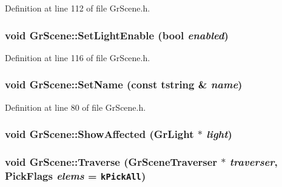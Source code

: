 Definition at line 112 of file GrScene.h.\hypertarget{class_gr_scene_1834cc42ace852985a396a950847a57e}{
\subsubsection[{SetLightEnable}]{\setlength{\rightskip}{0pt plus 5cm}void GrScene::SetLightEnable (bool {\em enabled})}}
\label{class_gr_scene_1834cc42ace852985a396a950847a57e}




Definition at line 116 of file GrScene.h.\hypertarget{class_gr_scene_73ef4498b63c8574ad8c34c81b8c5baf}{
\subsubsection[{SetName}]{\setlength{\rightskip}{0pt plus 5cm}void GrScene::SetName (const {\bf tstring} \& {\em name})}}
\label{class_gr_scene_73ef4498b63c8574ad8c34c81b8c5baf}




Definition at line 80 of file GrScene.h.\hypertarget{class_gr_scene_121b1f76ae65b017b644f2748fd52b05}{
\subsubsection[{ShowAffected}]{\setlength{\rightskip}{0pt plus 5cm}void GrScene::ShowAffected ({\bf GrLight} $\ast$ {\em light})}}
\label{class_gr_scene_121b1f76ae65b017b644f2748fd52b05}


\hypertarget{class_gr_scene_bd77c55363f70fdc20c346976948ab18}{
\subsubsection[{Traverse}]{\setlength{\rightskip}{0pt plus 5cm}void GrScene::Traverse ({\bf GrSceneTraverser} $\ast$ {\em traverser}, \/  {\bf PickFlags} {\em elems} = {\tt {\bf kPickAll}})}}
\label{class_gr_scene_bd77c55363f70fdc20c346976948ab18}




